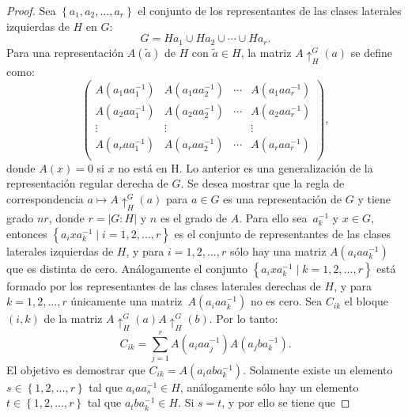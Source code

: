 \documentclass[12pt]{book}
\theoremstyle{definition}
\newcounter{in}
\begin{document}
\begin{proof}
Sea $\left\{ a_{1}, a_{2},\ldots,a_{r}\right\}$ el conjunto de los
representantes de las clases laterales izquierdas de $H$ en $G$:
\begin{equation}
  \label{eq:61}
  G = Ha_{1} \cup Ha_{2} \cup \cdots \cup Ha_{r}.
\end{equation}
Para una representación $A(\tilde{a})$ de $H$ con $\tilde{a} \in H$, la matriz $A\uparrow^{G}_{H}(a)$ se define como:
\begin{equation}
  \label{eq:62}
  \begin{pmatrix}
    A(a_{1} a a_{1}^{-1}) & A(a_{1} a a_{2}^{-1}) & \cdots &  A(a_{1} a a_{r}^{-1}) \\
    A(a_{2} a a_{1}^{-1}) & A(a_{2} a a_{2}^{-1}) & \cdots &  A(a_{2} a a_{r}^{-1}) \\
    \vdots & \vdots &  & \vdots \\ 
    A(a_{r} a a_{1}^{-1}) & A(a_{r} a a_{2}^{-1}) & \cdots &  A(a_{r} a a_{r}^{-1}) \\
  \end{pmatrix}
  ,
\end{equation}
donde $A(x)=0$ si $x$ no está en H. Lo anterior es una generalización
de la representación regular derecha de $G$. Se desea mostrar que la
regla de correspondencia $a \mapsto A\uparrow^{G}_{H}(a)$ para $a \in G$ es una
representación de $G$ y tiene grado $nr$, donde $r = |G:H|$ y
$n$ es el grado de $A$. Para ello sea~$a_{k}^{-1}$ y $x \in G$,
entonces
$\left\{ a_{i} x a_{k}^{-1} \mid i = 1, 2, \ldots, r \right\}$ es el
conjunto de representantes de las clases laterales izquierdas de $H$,
y para $i = 1, 2, \ldots, r$ sólo hay una matriz
$A(a_{i} a a_{k}^{-1})$ que es distinta de cero. Análogamente el
conjunto
$\left\{ a_{i} x a_{k}^{-1} \mid k = 1, 2, \ldots, r \right\}$ está
formado por los representantes de las clases laterales derechas de
$H$, y para $ k = 1, 2, \ldots, r$ únicamente una
matriz~$A(a_{i} a a_{k}^{-1})$ no es cero. Sea $C_{ik}$ el bloque
$(i,k)$ de la matriz $A\uparrow^{G}_{H}(a)A\uparrow^{G}_{H}(b)$. Por lo tanto:
\begin{equation}
  \label{eq:63}
  C_{ik} = \sum_{j=1}^{r} A(a_{i} a a_{j}^{-1}) A(a_{j} b a_{k}^{-1}).
\end{equation}
El objetivo es demostrar que $C_{ik}= A(a_{i} ab
a_{k}^{-1})$. Solamente existe un elemento
$s \in \left\{1, 2, \ldots, r \right\}$ tal que
$a_{i} a a_{s}^{-1} \in H$, análogamente sólo hay un elemento
$t \in \left\{1, 2, \ldots, r \right\}$ tal que
$a_{t} b a_{k}^{-1} \in H$. Si $s=t$, y por ello se tiene que

\end{proof}
\end{document}
